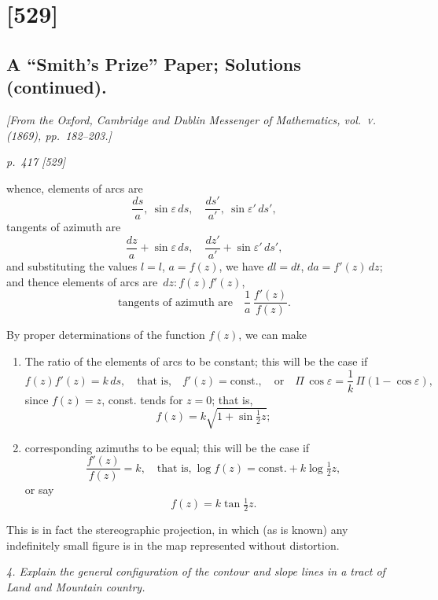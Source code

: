 \documentclass[11pt,a4paper]{article}
\theoremstyle{plain}
\theoremstyle{definition}
\begin{document}
\section{[529]}
\subsection{A ``Smith's Prize'' Paper; Solutions (continued).}

\begin{center}
\textit{[From the Oxford, Cambridge and Dublin Messenger of Mathematics, vol.~\textsc{v}. (1869), pp.~182--203.]}
\end{center}

\bigskip
\textit{p.~417 [529]}
\smallskip

\noindent
whence, elements of arcs are
\[
\frac{ds}{a},\ \sin\varepsilon\,ds, \quad \frac{ds'}{a'},\ \sin\varepsilon'\,ds',
\]
tangents of azimuth are
\[
\frac{dz}{a} + \sin\varepsilon\,ds, \quad \frac{dz'}{a'} + \sin\varepsilon'\,ds',
\]
and substituting the values $l = l$, $a = f(z)$, we have $dl = dt$, $da = f'(z)\,dz$; and thence
elements of arcs are $\,dz : f(z)f'(z)$,
\[
\text{tangents of azimuth are}\quad \frac{1}{a}\,\frac{f'(z)}{f(z)}.
\]

By proper determinations of the function $f(z)$, we can make

\begin{enumerate}[label=(\arabic*)]
\item The ratio of the elements of arcs to be constant; this will be the case if
\[
f(z)f'(z) = k\,ds, \quad \text{that is,}\quad f'(z) = \text{const.}, \quad \text{or}\quad \Pi\,\cos\varepsilon = \frac{1}{k}\,\Pi(1 - \cos\varepsilon),
\]
since $f(z) = z$, const. tends for $z = 0$; that is,
\[
f(z) = k\sqrt{1 + \sin\tfrac{1}{2}z};
\]
\item corresponding azimuths to be equal; this will be the case if
\[
\frac{f'(z)}{f(z)} = k, \quad \text{that is,}\ \log f(z) = \text{const.} + k \log\tfrac{1}{2}z,
\]
or say
\[
f(z) = k \tan\tfrac{1}{2}z.
\]
\end{enumerate}

This is in fact the stereographic projection, in which (as is known) any indefinitely small figure is in the map represented without distortion.

\textit{4. Explain the general configuration of the contour and slope lines in a tract of Land and Mountain country.}
\end{document}
